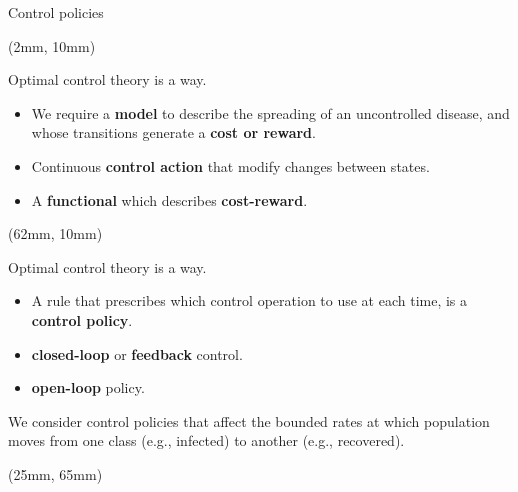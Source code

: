 {
\begin{frame}{Control policies}
    \begin{textblock*}{55mm}(2mm, 10mm)
        \begin{beamerboxesrounded}{Optimal control theory is a way.}
            \begin{itemize}
                \item
                    We require a \textbf{model} to describe the spreading of an 
                    uncontrolled disease, and whose transitions generate a 
                    \textbf{cost or reward}.
                \item
                    Continuous \textbf{control action} that modify changes 
                    between states.
                \item
                    A \textbf{functional} which describes \textbf{cost-reward}.
            \end{itemize}
        \end{beamerboxesrounded}
    \end{textblock*}
%
    \begin{textblock*}{65mm}(62mm, 10mm)
        \begin{beamerboxesrounded}{Optimal control theory is a way.}
            \begin{itemize}
                \item
                    A rule that prescribes which control
                    operation to use at each time, is a \textbf{control policy}.
                \item
                    \textbf{closed-loop} or \textbf{feedback} control.
                \item
                    \textbf{open-loop} policy.
            \end{itemize}
            We consider control policies that affect the bounded rates at which 
            population moves from one class (e.g., infected) to another (e.g., 
            recovered).
        \end{beamerboxesrounded}
    \end{textblock*}
    \begin{textblock*}{90mm}(25mm, 65mm)
        \begin{bibunit}[apalike]
            \nocite{Wickwire1977}
            \putbib
        \end{bibunit}
    \end{textblock*}
\end{frame}
}